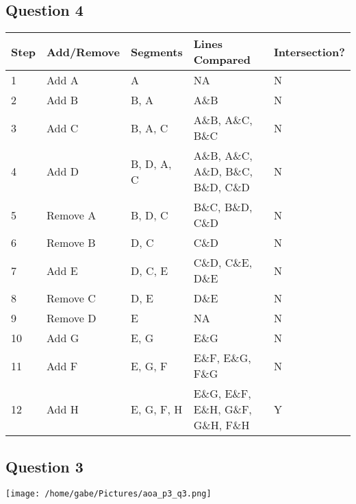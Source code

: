 \documentclass[12pt]{article}
\begin{document}
\subsection*{Question 4}
\begin{center}
  \begin{tabular}{ | l | l | l | l | l | }
    \hline
    Step & Add/Remove & Segments   & Lines Compared & Intersection? \\ \hline
    1    & Add A       & A          & NA    & N \\ \hline
		2    & Add B       & B, A       & A\&B    & N \\ \hline
		3    & Add C       & B, A, C    & A\&B, A\&C, B\&C & N \\ \hline
		4    & Add D       & B, D, A, C & A\&B, A\&C, A\&D, B\&C, B\&D, C\&D & N \\ \hline
		5    & Remove A    & B, D, C    & B\&C, B\&D, C\&D & N \\ \hline
		6    & Remove B    & D, C       & C\&D     & N \\ \hline
		7    & Add E       & D, C, E    & C\&D, C\&E, D\&E     & N \\ \hline
		8    & Remove C    & D, E       & D\&E     & N \\ \hline
    9    & Remove D    & E          & NA     & N \\ \hline
		10   & Add G			 & E, G       & E\&G     & N \\ \hline
		11   & Add F			 & E, G, F    & E\&F, E\&G, F\&G     & N \\ \hline
		12   & Add H	  	 & E, G, F, H & E\&G, E\&F, E\&H, G\&F, G\&H, F\&H & Y \\ \hline
  \end{tabular}
\end{center}


\subsection*{Question 3}

\texttt{[image: /home/gabe/Pictures/aoa\_p3\_q3.png]}
\end{document}
